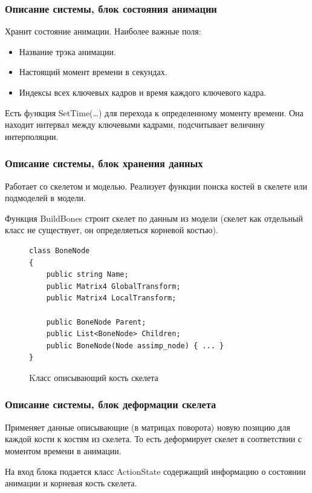 \documentclass{beamer}
\begin{document}
\begin{frame}
\frametitle{Описание системы, блок состояния анимации}	
	Хранит состояние анимации. Наиболее важные поля:
\begin{itemize}        
    \item Название трэка анимации.
	\item Настоящий момент времени в секундах.
	\item Индексы всех ключевых кадров и время каждого ключевого кадра.
\end{itemize}

    Есть фyнкция SetTime(\dots) для перехода к определенному моменту времени. Она находит интервал между ключевыми кадрами, подсчитывает величину интерполяции.
\end{frame}




\begin{frame}[fragile]
\frametitle{Описание системы, блок хранения данных}
\begin{multicols}{2}
    Работает со скелетом и моделью. Реализует функции поиска костей в скелете или подмоделей в модели.
    
    \smallskip
    Функция BuildBones строит скелет по данным из модели (скелет как отдельный класс не существует, он определяеться корневой костью). 
    
    \columnbreak
    
\begin{figure}
\begin{scriptsize}
\begin{verbatim}
class BoneNode
{
    public string Name;
    public Matrix4 GlobalTransform;
    public Matrix4 LocalTransform;
    
    public BoneNode Parent;
    public List<BoneNode> Children;
    public BoneNode(Node assimp_node) { ... }
}
\end{verbatim}
\end{scriptsize}
\caption{Kласс описывающий кость скелета}
\end{figure}

\end{multicols}
\end{frame}


\begin{frame}
\frametitle{Описание системы, блок деформации скелета}
    Применяет данные описывающие (в матрицах поворота) новую позицию для каждой кости к костям из скелета. То есть деформирует скелет в соответствии с моментом времени в анимации.
    
    \medskip
    На вход блока подается класс ActionState содержащий информацию о состоянии анимации и корневая кость скелета.
\end{frame}
\end{document}

